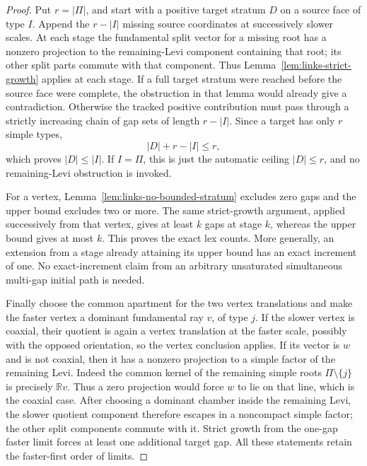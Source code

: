 \begin{proof}
Put \(r=|\Pi|\), and start with a positive target stratum \(D\)
on a source face of type \(I\). Append the \(r-|I|\) missing
source coordinates at successively slower scales. At each stage
the fundamental split vector for a missing root has a nonzero
projection to the remaining-Levi component containing that root;
its other split parts commute with that component. Thus
Lemma~\ref{lem:links-strict-growth} applies at each stage. If a
full target stratum were reached before the source face were
complete, the obstruction in that lemma would already give a
contradiction. Otherwise the tracked positive contribution must
pass through a strictly increasing chain of gap sets of length
\(r-|I|\). Since a target has only \(r\) simple types,
\[
 |D|+r-|I|\leq r,
\]
which proves \(|D|\leq|I|\). If \(I=\Pi\), this is just the
automatic ceiling \(|D|\leq r\), and no remaining-Levi
obstruction is invoked.

For a vertex, Lemma~\ref{lem:links-no-bounded-stratum} excludes
zero gaps and the upper bound excludes two or more. The same
strict-growth argument, applied successively from that vertex,
gives at least \(k\) gaps at stage \(k\), whereas the upper
bound gives at most \(k\). This proves the exact lex counts.
More generally, an extension from a stage already attaining its
upper bound has an exact increment of one. No exact-increment
claim from an arbitrary unsaturated simultaneous multi-gap
initial path is needed.

Finally choose the common apartment for the two vertex
translations and make the faster vertex a dominant fundamental
ray \(v\), of type \(j\). If the slower vertex is coaxial,
their quotient is again a vertex translation at the faster
scale, possibly with the opposed orientation, so the vertex
conclusion applies. If its vector is \(w\) and is not coaxial,
then it has a nonzero projection to a simple factor of the
remaining Levi. Indeed the common kernel of the remaining simple
roots \(\Pi\setminus\{j\}\) is precisely \(\mathbb Rv\).
Thus a zero projection would force \(w\) to lie on that line,
which is the coaxial case. After choosing a dominant chamber
inside the remaining Levi, the slower quotient component
therefore escapes in a noncompact simple factor; the other
split components commute with it. Strict growth from the
one-gap faster limit forces at least one additional target gap.
All these statements retain the faster-first order of limits.
\end{proof}
